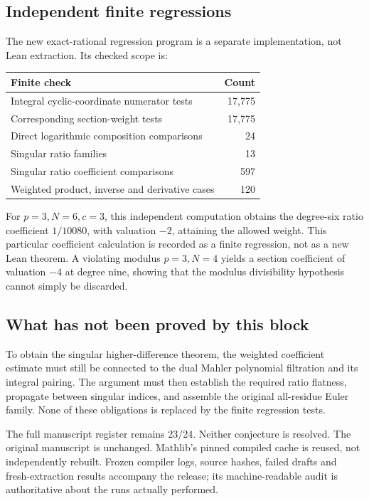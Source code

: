 \documentclass[11pt]{article}
\begin{document}
\subsection*{Independent finite regressions}
The new exact-rational regression program is a separate implementation, not Lean extraction. Its checked scope is:
\begin{center}\begin{tabular}{lr}\toprule
Finite check & Count\\\midrule
Integral cyclic-coordinate numerator tests &17,775\\
Corresponding section-weight tests &17,775\\
Direct logarithmic composition comparisons &24\\
Singular ratio families &13\\
Singular ratio coefficient comparisons &597\\
Weighted product, inverse and derivative cases &120\\\bottomrule
\end{tabular}\end{center}
For $p=3,N=6,c=3$, this independent computation obtains the degree-six ratio coefficient $1/10080$, with valuation $-2$, attaining the allowed weight. This particular coefficient calculation is recorded as a finite regression, not as a new Lean theorem. A violating modulus $p=3,N=4$ yields a section coefficient of valuation $-4$ at degree nine, showing that the modulus divisibility hypothesis cannot simply be discarded.

\subsection*{What has not been proved by this block}
To obtain the singular higher-difference theorem, the weighted coefficient estimate must still be connected to the dual Mahler polynomial filtration and its integral pairing. The argument must then establish the required ratio flatness, propagate between singular indices, and assemble the original all-residue Euler family. None of these obligations is replaced by the finite regression tests.

The full manuscript register remains 23/24. Neither conjecture is resolved. The original manuscript is unchanged. Mathlib's pinned compiled cache is reused, not independently rebuilt. Frozen compiler logs, source hashes, failed drafts and fresh-extraction results accompany the release; its machine-readable audit is authoritative about the runs actually performed.
\end{document}
